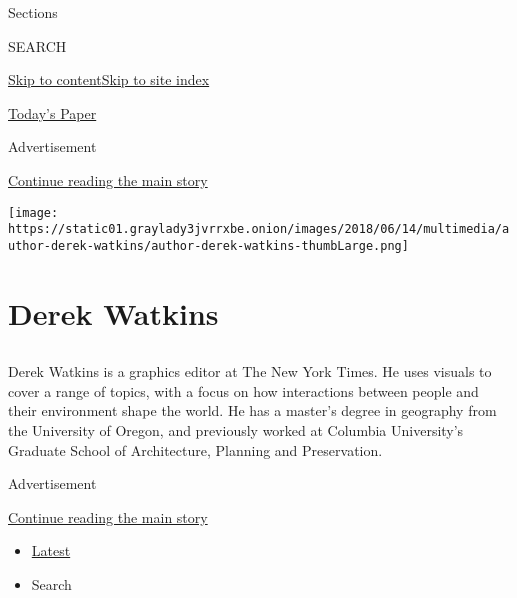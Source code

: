 Sections

SEARCH

\protect\hyperlink{site-content}{Skip to
content}\protect\hyperlink{site-index}{Skip to site index}

\href{https://myaccount.nytimes3xbfgragh.onion/auth/login?response_type=cookie\&client_id=vi}{}

\href{https://www.nytimes3xbfgragh.onion/section/todayspaper}{Today's
Paper}

Advertisement

\protect\hyperlink{after-top}{Continue reading the main story}

\texttt{[image: https://static01.graylady3jvrrxbe.onion/images/2018/06/14/multimedia/author-derek-watkins/author-derek-watkins-thumbLarge.png]}

\hypertarget{derek-watkins}{%
\section{Derek Watkins}\label{derek-watkins}}

\subsection{}

Derek Watkins is a graphics editor at The New York Times. He uses
visuals to cover a range of topics, with a focus on how interactions
between people and their environment shape the world. He has a master's
degree in geography from the University of Oregon, and previously worked
at Columbia University's Graduate School of Architecture, Planning and
Preservation.

Advertisement

\protect\hyperlink{after-mid1}{Continue reading the main story}

\begin{itemize}
\tightlist
\item
  \protect\hyperlink{stream-panel}{Latest}
\item
  Search
\end{itemize}

